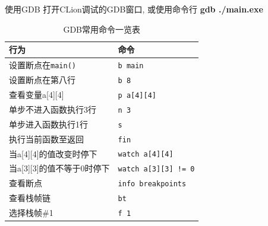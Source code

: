 \begin{frame}[fragile]{使用GDB}
    打开CLion调试的GDB窗口, 或使用命令行 \textbf{gdb ./main.exe}

    \begin{table}[]
        \begin{tabular}{|l|l|}
            \hline
            \textbf{行为} & \textbf{命令} \\ \hline
            设置断点在\texttt{main()} & \texttt{b main} \\ \hline
            设置断点在第八行 & \texttt{b 8} \\ \hline
            查看变量a[4][4] & \texttt{p a[4][4]} \\ \hline
            单步不进入函数执行3行 & \texttt{n 3} \\ \hline
            单步进入函数执行1行 & \texttt{s} \\ \hline
            执行当前函数至返回 & \texttt{fin} \\ \hline
            当a[4][4]的值改变时停下 & \texttt{watch a[4][4]} \\ \hline
            当a[3][3]的值不等于0时停下 & \texttt{watch a[3][3] != 0} \\ \hline
            查看断点 & \texttt{info breakpoints} \\ \hline
            查看栈帧链 & \texttt{bt} \\ \hline
            选择栈帧\#1 & \texttt{f 1} \\ \hline
        \end{tabular}
        \caption{GDB常用命令一览表}
    \end{table}
\end{frame}